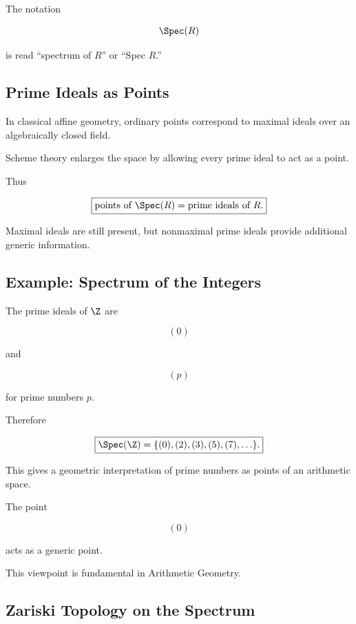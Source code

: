 The notation

\[
\Spec(R)
\]

is read ``spectrum of \(R\)'' or ``Spec \(R\).''

\subsection{Prime Ideals as Points}
\label{subsec:prime-ideals-as-points}

In classical affine geometry, ordinary points correspond to maximal ideals
over an algebraically closed field.

Scheme theory enlarges the space by allowing every prime ideal to act as a
point.

Thus

\[
\boxed{
\text{points of }\Spec(R)
=
\text{prime ideals of }R.
}
\]

Maximal ideals are still present, but nonmaximal prime ideals provide
additional generic information.

\subsection{Example: Spectrum of the Integers}
\label{subsec:spectrum-integers}

The prime ideals of \(\Z\) are

\[
(0)
\]

and

\[
(p)
\]

for prime numbers \(p\).

Therefore

\[
\boxed{
\Spec(\Z)
=
\{
(0),(2),(3),(5),(7),\ldots
\}.
}
\]

This gives a geometric interpretation of prime numbers as points of an
arithmetic space.

The point

\[
(0)
\]

acts as a generic point.

This viewpoint is fundamental in Arithmetic Geometry.

\subsection{Zariski Topology on the Spectrum}
\label{subsec:zariski-spectrum}

